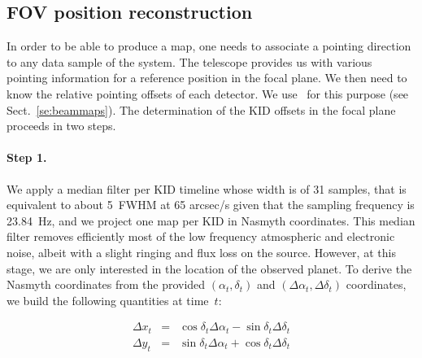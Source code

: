 

\subsection{FOV position reconstruction}
\label{se:fov_geometry}

In order to be able to produce a map, one needs to associate a pointing
direction to any data sample of the system. The telescope provides us with
various pointing information for a reference position in the focal plane. We
then need to know the relative pointing offsets of each detector. We use
\bms\ for this purpose (see Sect.~\ref{se:beammaps}). The determination of the
KID offsets in the focal plane proceeds in two steps.

\paragraph{Step 1.} We apply a median filter per
KID timeline whose width is of 31 samples, that is equivalent to about 
5~FWHM at 65 arcsec/s given that the sampling frequency is 23.84~Hz,
and we project one map per KID in Nasmyth
coordinates. This median filter removes
efficiently most of the low frequency atmospheric and electronic
noise, albeit with a slight ringing and flux loss on the
source. However, at this stage, we are only interested in the location
of the observed planet.
To derive the Nasmyth coordinates from the
provided $(\alpha_t,\delta_t)$ and $(\Delta\alpha_t,\Delta\delta_t)$
coordinates, we build the following quantities at time~$t$:

\begin{eqnarray}
\Delta x_t &=& \cos\delta_t \Delta\alpha_t - \sin \delta_t\Delta \delta_t \nonumber \\
\Delta y_t &=& \sin\delta_t \Delta\alpha_t + \cos \delta_t\Delta \delta_t \nonumber
\end{eqnarray}

